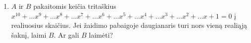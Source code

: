 \begin{enumerate}
  \item $A$ ir $B$ pakaitomis keičia tritaškius $x^{10}+\dots x^9+\dots x^8+\dots
    x^7+\dots x^6+\dots x^5+\dots x^4+\dots x^3+\dots x^2+\dots x+1=0$ į
    realiuosius skaičius. Jei žaidimo pabaigoje daugianaris turi nors vieną
    realiąją šaknį, laimi $B$. Ar gali $B$ laimėti?


\end{enumerate}
